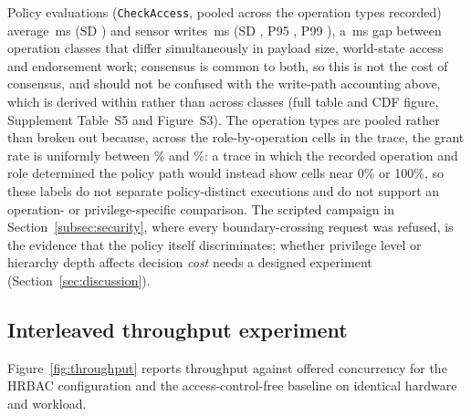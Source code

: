 \documentclass[a4paper,fleqn]{cas-sc}
\begin{document}
Policy evaluations (\texttt{CheckAccess}, pooled across the \DecisionOps{}
operation types recorded) average \DecisionMean\,ms (SD \DecisionSD) and
sensor writes \WriteMean\,ms (SD \WriteSD, P95 \WritePNinetyFive, P99
\WritePNinetyNine), a \CommitCost\,ms gap between operation classes that
differ simultaneously in payload size, world-state access and endorsement
work; consensus is common to both, so this is not the cost of consensus,
and should not be confused with the write-path accounting above, which is
derived within rather than across classes (full table and CDF figure,
Supplement Table~S5 and Figure~S3). The \DecisionOps{} operation types are
pooled rather than broken out because, across the \PolicyCells{}
role-by-operation cells in the trace, the grant rate is uniformly between
\PolicyGrantMin\% and \PolicyGrantMax\%: a trace in which the recorded
operation and role determined the policy path would instead show cells
near 0\% or 100\%, so these labels do not separate policy-distinct
executions and do not support an operation- or privilege-specific
comparison. The scripted campaign in Section~\ref{subsec:security}, where
every boundary-crossing request was refused, is the evidence that the
policy itself discriminates; whether privilege level or hierarchy depth
affects decision \emph{cost} needs a designed experiment
(Section~\ref{sec:discussion}).

\subsection{Interleaved throughput experiment}
\label{subsec:throughput}

Figure~\ref{fig:throughput} reports throughput against offered concurrency
for the HRBAC configuration and the access-control-free baseline on
identical hardware and workload.
\end{document}
